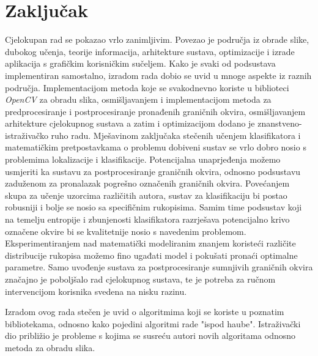 \documentclass[times, utf8, diplomski]{fer}
\theoremstyle{definition}
\begin{document}
\chapter{Zaključak}
Cjelokupan rad se pokazao vrlo zanimljivim. Povezao je područja iz obrade slike, dubokog učenja, teorije informacija, arhitekture sustava, optimizacije i izrade aplikacija s grafičkim korisničkim sučeljem. Kako je svaki od podsustava implementiran samostalno, izradom rada dobio se uvid u mnoge aspekte iz raznih područja. Implementacijom metoda koje se svakodnevno koriste u biblioteci \textit{OpenCV} za obradu slika, osmišljavanjem i implementacijom metoda za predprocesiranje i postprocesiranje pronađenih graničnih okvira, osmišljavanjem arhitekture cjelokupnog sustava a zatim i optimizacijom dodano je znanstveno-istraživačko ruho radu. Mješavinom zaključaka stečenih učenjem klasifikatora i matematičkim pretpostavkama o problemu dobiveni sustav se vrlo dobro nosio s problemima lokalizacije i klasifikacije.
Potencijalna unaprjeđenja možemo usmjeriti ka sustavu za postprocesiranje graničnih okvira, odnosno podsustavu zaduženom za pronalazak pogrešno označenih graničnih okvira.  Povećanjem skupa za učenje uzorcima različitih autora, sustav za klasifikaciju bi postao robusniji i bolje se nosio sa specifičnim rukopisima. Samim time podsustav koji na temelju entropije i zbunjenosti klasifikatora razrješava potencijalno krivo označene okvire  bi se kvalitetnije nosio s navedenim problemom. Eksperimentiranjem nad matematički modeliranim znanjem koristeći različite distribucije rukopisa  možemo fino ugađati model i pokušati pronaći optimalne parametre.  Samo uvođenje sustava za postprocesiranje sumnjivih graničnih okvira  značajno je poboljšalo rad cjelokupnog sustava, te je potreba za ručnom intervencijom korisnika svedena na nisku razinu. 

Izradom ovog rada stečen je uvid  o algoritmima koji se koriste u poznatim bibliotekama, odnosno kako pojedini algoritmi rade "ispod haube". Istraživački dio približio je probleme s kojima se susreću autori novih algoritama odnosno metoda za obradu slika.
\nocite{*}



\end{document}
